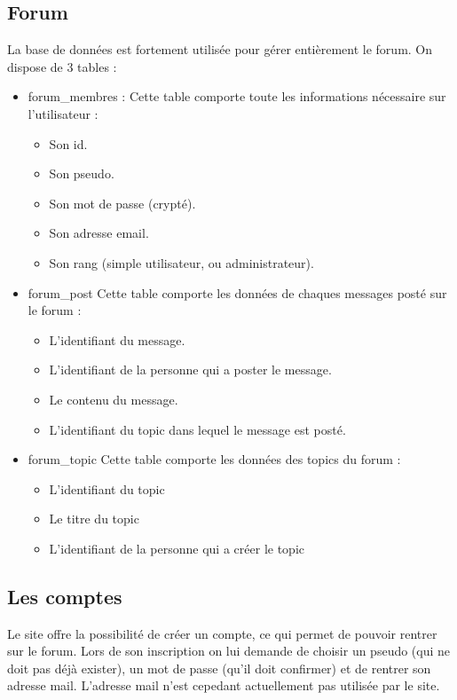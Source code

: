 \documentclass[a4paper, 12pt]{article}
\begin{document}
\subsection{Forum}
La base de données est fortement utilisée pour gérer entièrement le forum. On dispose de 3 tables :
\begin{itemize}
\item forum\_membres :
  Cette table comporte toute les informations nécessaire sur l'utilisateur :
  \begin{itemize}
  \item Son id.
  \item Son pseudo.
  \item Son mot de passe (crypté).
  \item Son adresse email.
  \item Son rang (simple utilisateur, ou administrateur).
  \end{itemize}

\item forum\_post
  Cette table comporte les données de chaques messages posté sur le forum :
  \begin{itemize}
  \item L'identifiant du message.
  \item L'identifiant de la personne qui a poster le message.
  \item Le contenu du message.
  \item L'identifiant du topic dans lequel le message est posté.
  \end{itemize}

\item forum\_topic
  Cette table comporte les données des topics du forum :
  \begin{itemize}
  \item L'identifiant du topic
  \item Le titre du topic
  \item L'identifiant de la personne qui a créer le topic
  \end{itemize}
\end{itemize}

\subsection{Les comptes}
Le site offre la possibilité de créer un compte, ce qui permet de pouvoir rentrer sur le forum.
Lors de son inscription on lui demande de choisir un pseudo (qui ne doit pas déjà exister), un mot de passe (qu'il doit confirmer) et de rentrer son adresse mail. L'adresse mail n'est cepedant actuellement pas utilisée par le site.
\end{document}
